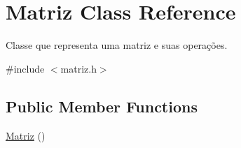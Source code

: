 \hypertarget{class_matriz}{\section{Matriz Class Reference}
\label{class_matriz}
}


Classe que representa uma matriz e suas operações.  




{\ttfamily \#include $<$matriz.\+h$>$}

\subsection*{Public Member Functions}
\begin{DoxyCompactItemize}
\item 
\hypertarget{class_matriz_a7de756301bddbc4b0b5d2a0f2b1fc695}{\hyperlink{class_matriz_a7de756301bddbc4b0b5d2a0f2b1fc695}{Matriz} ()}\label{class_matriz_a7de756301bddbc4b0b5d2a0f2b1fc695}


\end{DoxyCompactItemize}
